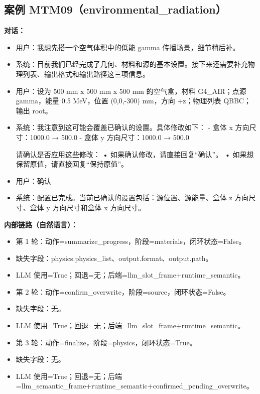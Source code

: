 \documentclass[11pt]{ctexart}
\begin{document}
\subsection{案例 MTM09（environmental\_radiation）}
\textbf{对话：}
\begin{itemize}
\item 用户：我想先搭一个空气体积中的低能 gamma 传播场景，细节稍后补。
\item 系统：目前我们已经完成了几何、材料和源的基本设置。接下来还需要补充物理列表、输出格式和输出路径这三项信息。
\item 用户：设为 500 mm x 500 mm x 500 mm 的空气盒，材料 G4\_AIR；点源 gamma，能量 0.5 MeV，位置 (0,0,-300) mm，方向 +z；物理列表 QBBC；输出 root。
\item 系统：我注意到这可能会覆盖已确认的设置。具体修改如下：
- 盒体 x 方向尺寸：1000.0 → 500.0
- 盒体 y 方向尺寸：1000.0 → 500.0

请确认是否应用这些修改：
• 如果确认修改，请直接回复“确认”。
• 如果想保留原值，请直接回复“保持原值”。
\item 用户：确认
\item 系统：配置已完成。当前已确认的设置包括：源位置、源能量、盒体 z 方向尺寸、盒体 y 方向尺寸和盒体 x 方向尺寸。
\end{itemize}
\textbf{内部链路（自然语言）：}
\begin{itemize}
\item 第 1 轮：动作=summarize\_progress，阶段=materials，闭环状态=False。
\item 缺失字段：physics.physics\_list、output.format、output.path。
\item LLM 使用=True；回退=无；后端=llm\_slot\_frame+runtime\_semantic。
\item 第 2 轮：动作=confirm\_overwrite，阶段=source，闭环状态=False。
\item 缺失字段：无。
\item LLM 使用=True；回退=无；后端=llm\_slot\_frame+runtime\_semantic。
\item 第 3 轮：动作=finalize，阶段=physics，闭环状态=True。
\item 缺失字段：无。
\item LLM 使用=True；回退=无；后端=llm\_semantic\_frame+runtime\_semantic+confirmed\_pending\_overwrite。
\end{itemize}
\end{document}
